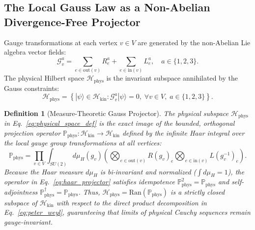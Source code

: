 \documentclass[11pt,reqno]{article}
\newtheorem{definition}[theorem]{Definition}
\begin{document}
\subsection{The Local Gauss Law as a Non-Abelian Divergence-Free Projector}
Gauge transformations at each vertex $v \in V$ are generated by the non-Abelian Lie algebra vector fields:
\begin{equation}
    \label{eq:gauss_generators}
    \mathcal{G}_v^a = \sum_{e \in \mathrm{out}(v)} R_e^a + \sum_{e \in \mathrm{in}(v)} L_e^a, \quad a \in \{1, 2, 3\}.
\end{equation}
The physical Hilbert space $\mathcal{H}_{\mathrm{phys}}$ is the invariant subspace annihilated by the Gauss constraints:
\begin{equation}
    \label{eq:physical_space_def}
    \mathcal{H}_{\mathrm{phys}} = \left\{ |\psi\rangle \in \mathcal{H}_{\mathrm{kin}} : \mathcal{G}_v^a |\psi\rangle = 0, \; \forall v \in V, \; a \in \{1, 2, 3\} \right\}.
\end{equation}

\begin{definition}[Measure-Theoretic Gauss Projector]
\label{def:gauss_projector}
The physical subspace $\mathcal{H}_{\mathrm{phys}}$ in Eq.~\eqref{eq:physical_space_def} is the exact image of the bounded, orthogonal projection operator $\mathbb{P}_{\mathrm{phys}}: \mathcal{H}_{\mathrm{kin}} \to \mathcal{H}_{\mathrm{kin}}$ defined by the infinite Haar integral over the local gauge group transformations at all vertices:
\begin{equation}
    \label{eq:haar_projector}
    \mathbb{P}_{\mathrm{phys}} = \prod_{v \in V} \int_{SU(2)} d\mu_H(g_v) \left( \bigotimes_{e \in \mathrm{out}(v)} R(g_v)_e \bigotimes_{e \in \mathrm{in}(v)} L(g_v^{-1})_e \right).
\end{equation}
Because the Haar measure $d\mu_H$ is bi-invariant and normalized ($\int d\mu_H = 1$), the operator in Eq.~\eqref{eq:haar_projector} satisfies idempotence $\mathbb{P}_{\mathrm{phys}}^2 = \mathbb{P}_{\mathrm{phys}}$ and self-adjointness $\mathbb{P}_{\mathrm{phys}}^\dagger = \mathbb{P}_{\mathrm{phys}}$. Thus, $\mathcal{H}_{\mathrm{phys}} = \mathrm{Ran}(\mathbb{P}_{\mathrm{phys}})$ is a strictly closed subspace of $\mathcal{H}_{\mathrm{kin}}$ with respect to the direct product decomposition in Eq.~\eqref{eq:peter_weyl}, guaranteeing that limits of physical Cauchy sequences remain gauge-invariant.
\end{definition}
\end{document}
